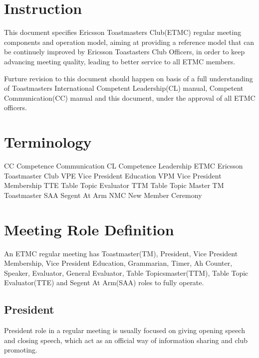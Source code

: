 

\section{Instruction}

This document specifies Ericsson Toastmasters Club(ETMC) regular meeting 
components and operation model, aiming at providing a reference model
that can be continuely improved by Ericsson Toastasters Club Officers, 
in order to keep advancing meeting quality, leading to better service to 
all ETMC members.

Furture revision to this document should happen on basis of a full 
understanding of Toastmasters International Competent Leadership(CL)
manual, Competent Communication(CC) manual and this document, under
the approval of all ETMC officers.

\section{Terminology}

CC   Competence Communication
CL   Competence Leadership
ETMC Ericsson Toastmaster Club
VPE  Vice President Education
VPM  Vice President Membership
TTE  Table Topic Evaluator
TTM  Table Topic Master
TM   Toastmaster
SAA  Segent At Arm
NMC  New Member Ceremony

\section{Meeting Role Definition}

An ETMC regular meeting has Toastmaster(TM), President, Vice President 
Membership, Vice President Education, Grammarian, Timer, Ah Counter,
Speaker, Evaluator, General Evaluator, Table Topicsmaster(TTM), Table 
Topic Evaluator(TTE) and Segent At Arm(SAA) roles to fully operate.  

\subsection{President}

President role in a regular meeting is usually focused on giving opening 
speech and closing speech, which act as an official way of information 
sharing and club promoting.

